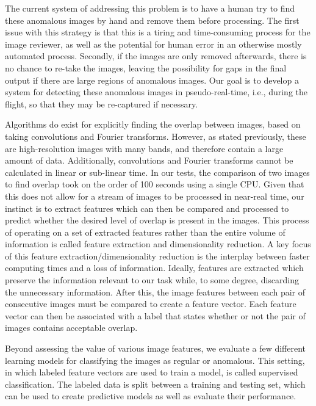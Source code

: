 The current system of addressing this problem is to have a human try to find these anomalous images by hand and remove them before processing.
The first issue with this strategy is that this is a tiring and time-consuming process for the image reviewer, as well as the potential for human error in an otherwise mostly automated process.
Secondly, if the images are only removed afterwards, there is no chance to re-take the images, leaving the possibility for gaps in the final output if there are large regions of anomalous images.
Our goal is to develop a system for detecting these anomalous images in pseudo-real-time, i.e., during the flight, so that they may be re-captured if necessary.

Algorithms do exist for explicitly finding the overlap between images, based on taking convolutions and Fourier transforms.
However, as stated previously, these are high-resolution images with many bands, and therefore contain a large amount of data.
Additionally, convolutions and Fourier transforms cannot be calculated in linear or sub-linear time.
In our tests, the comparison of two images to find overlap took on the order of 100 seconds using a single CPU.
Given that this does not allow for a stream of images to be processed in near-real time, our instinct is to extract features which can then be compared and processed to predict whether the desired level of overlap is present in the images.
This process of operating on a set of extracted features rather than the entire volume of information is called feature extraction and dimensionality reduction.
A key focus of this feature extraction/dimensionality reduction is the interplay between faster computing times and a loss of information.
Ideally, features are extracted which preserve the information relevant to our task while, to some degree, discarding the unnecessary information.
After this, the image features between each pair of consecutive images must be compared to create a feature vector.
Each feature vector can then be associated with a label that states whether or not the pair of images contains acceptable overlap.

Beyond assessing the value of various image features, we evaluate a few different learning models for classifying the images as regular or anomalous.
This setting, in which labeled feature vectors are used to train a model, is called supervised classification.
The labeled data is split between a training and testing set, which can be used to create predictive models as well as evaluate their performance.


